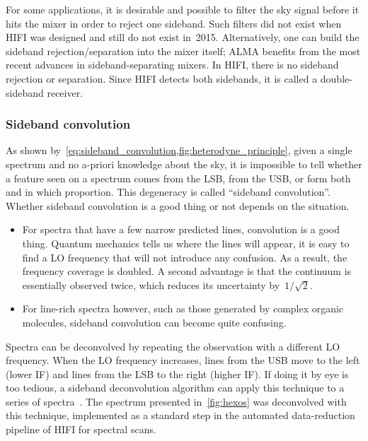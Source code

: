 For some applications, it is desirable and possible to filter the sky signal before it hits the mixer in order to reject one sideband.
Such filters did not exist when HIFI was designed and still do not exist in~2015.
Alternatively, one can build the sideband rejection/separation into the mixer itself; ALMA benefits from the most recent advances in sideband-separating mixers.
In HIFI, there is no sideband rejection or separation.
Since HIFI detects both sidebands, it is called a double-sideband receiver.



\subsubsection{Sideband convolution}

As shown by~\cref{eq:sideband_convolution,fig:heterodyne_principle}, given a single spectrum and no a-priori knowledge about the sky, it is impossible to tell whether a feature seen on a spectrum comes from the LSB, from the USB, or form both and in which proportion.
This degeneracy is called ``sideband convolution''.
Whether sideband convolution is a good thing or not depends on the situation.
\begin{itemize}[noitemsep,nolistsep]
    \item For spectra that have a few narrow predicted lines, convolution is a good thing.
    Quantum mechanics tells us where the lines will appear, it is easy to find a LO frequency that will not introduce any confusion.
    As a result, the frequency coverage is doubled.
    A second advantage is that the continuum is essentially observed twice, which reduces its uncertainty by~$1/\sqrt{2}$.
    \item For line-rich spectra however, such as those generated by complex organic molecules, sideband convolution can become quite confusing.
\end{itemize}

Spectra can be deconvolved by repeating the observation with a different LO frequency.
When the LO frequency increases, lines from the USB move to the left (lower IF) and lines from the LSB to the right (higher IF).
If doing it by eye is too tedious, a sideband deconvolution algorithm can apply this technique to a series of spectra~\parencite{comito2002deconvolution}.
The spectrum presented in~\cref{fig:hexos} was deconvolved with this technique, implemented as a standard step in the automated data-reduction pipeline of HIFI for spectral scans.

